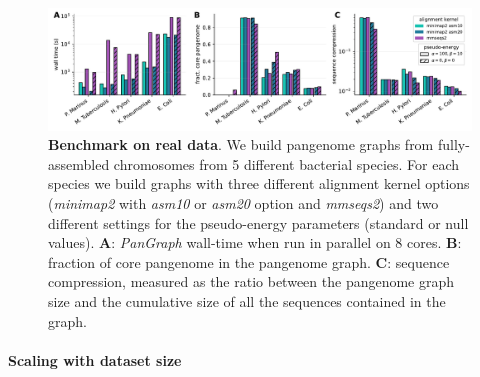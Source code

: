\documentclass[aps,rmp,reprint,superscriptaddress,notitlepage,10pt]{revtex4-1}
\begin{document}
\begin{figure}[htb]
    \includegraphics[width=\textwidth]{figs/panx_benchmark.pdf}
    \caption{{\bf Benchmark on real data}.
        We build pangenome graphs from fully-assembled chromosomes from 5 different bacterial species. For each species we build graphs with three different alignment kernel options (\textit{minimap2} with \textit{asm10} or \textit{asm20} option and \textit{mmseqs2}) and two different settings for the pseudo-energy parameters (standard or null values).
        \textbf{A}: \textit{PanGraph} wall-time when run in parallel on 8 cores.
        \textbf{B}: fraction of core pangenome in the pangenome graph.
        \textbf{C}: sequence compression, measured as the ratio between the pangenome graph size and the cumulative size of all the sequences contained in the graph.
    }
    \label{fig:panx-benchmark}
\end{figure}

\paragraph*{Scaling with dataset size}
\end{document}
